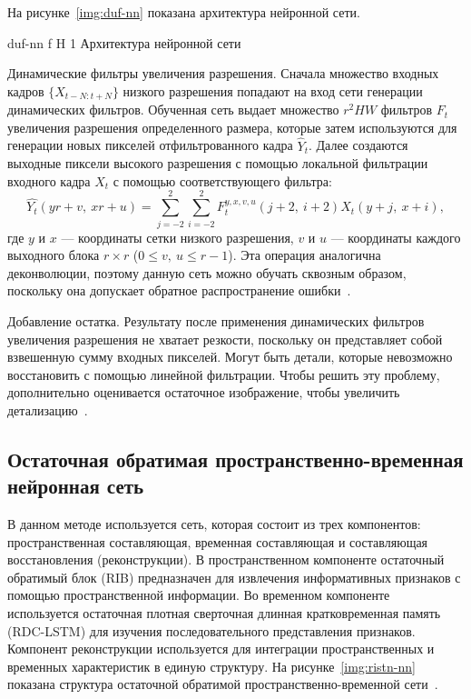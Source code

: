 \documentclass{bmstu}
\begin{document}
На рисунке~\ref{img:duf-nn} показана архитектура нейронной сети. 


    {duf-nn}
    {f}
    {H}
    {1\textwidth}
    {Архитектура нейронной сети~\cite{Younghyun2018}}
    
Динамические фильтры увеличения разрешения. 
Сначала множество входных кадров $\{X_{t - N:t + N}\}$ низкого разрешения попадают на вход сети генерации динамических фильтров. 
Обученная сеть выдает множество $r^{2}HW$ фильтров $F_t$ увеличения разрешения определенного размера, которые затем используются для генерации новых пикселей отфильтрованного кадра $\hat{Y}_t$. 
Далее создаются выходные пиксели высокого разрешения с помощью локальной фильтрации входного кадра $X_t$ с помощью соответствующего фильтра:
\begin{equation}
\hat{Y_t}(yr + v,~xr + u) = \sum_{j = -2}^{2} \sum_{i = -2}^{2} F^{y,x,v,u}_{t}(j + 2,~i + 2)X_{t}(y + j,~x + i),
\end{equation}
где $y$ и $x$ --- координаты сетки низкого разрешения, $v$ и $u$ --- координаты каждого выходного блока $r \times r$ ($0 \leq v,~u \leq r - 1$). 
Эта операция аналогична деконволюции, поэтому данную сеть можно обучать сквозным образом, поскольку она допускает обратное распространение ошибки~\cite{Younghyun2018}.

Добавление остатка. 
Результату после применения динамических фильтров увеличения разрешения не хватает резкости, поскольку он представляет собой взвешенную сумму входных пикселей. 
Могут быть детали, которые невозможно восстановить с помощью линейной фильтрации. 
Чтобы решить эту проблему, дополнительно оценивается остаточное изображение, чтобы увеличить детализацию~\cite{Younghyun2018}.

\subsection{Остаточная обратимая пространственно-временная нейронная сеть}

В данном методе используется сеть, которая состоит из трех компонентов: пространственная составляющая, временная составляющая и составляющая восстановления (реконструкции). 
В пространственном компоненте остаточный обратимый блок (RIB) предназначен для извлечения информативных признаков с помощью пространственной информации. 
Во временном компоненте используется остаточная плотная сверточная длинная кратковременная память (RDC-LSTM) для изучения последовательного представления признаков. 
Компонент реконструкции используется для интеграции пространственных и временных характеристик в единую структуру. 
На рисунке~\ref{img:ristn-nn} показана структура остаточной обратимой пространственно-временной сети~\cite{Xiaobin2019}.
\end{document}
